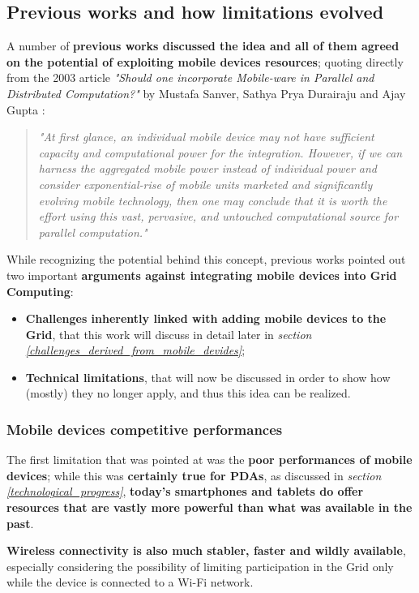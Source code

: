 \subsection{Previous works and how limitations evolved}\label{previous_works_and_limitations}
A number of \textbf{previous works discussed the idea and all of them agreed on the potential of exploiting mobile devices resources}; quoting directly from the 2003 article \textit{"Should one incorporate Mobile-ware in Parallel and Distributed Computation?"} by Mustafa Sanver, Sathya Prya Durairaju and Ajay Gupta \cite{should_one_incorporate_mobile_ware}:
\begin{quotation}
    \textit{"At first glance, an individual mobile device may not have sufficient capacity and computational power for the integration. However, if we can harness the aggregated mobile power instead of individual power and consider exponential-rise of mobile units marketed and significantly evolving mobile technology, then one may conclude that it is worth the effort using this vast, pervasive, and untouched computational source for parallel computation."}
\end{quotation}

While recognizing the potential behind this concept, previous works pointed out two important \textbf{arguments against integrating mobile devices into Grid Computing}:
\begin{itemize}
    \item \textbf{Challenges inherently linked with adding mobile devices to the Grid}, that this work will discuss in detail later in \textit{section \ref{challenges_derived_from_mobile_devides}};
    \item \textbf{Technical limitations}, that will now be discussed in order to show how (mostly) they no longer apply, and thus this idea can be realized.
\end{itemize}

\subsubsection{Mobile devices competitive performances}
The first limitation that was pointed at was the \textbf{poor performances of mobile devices}; while this was \textbf{certainly true for PDAs}, as discussed in \textit{section \ref{technological_progress}}, \textbf{today's smartphones and tablets do offer resources that are vastly more powerful than what was available in the past}.

\textbf{Wireless connectivity is also much stabler, faster and wildly available}, especially considering the possibility of limiting participation in the Grid only while the device is connected to a Wi-Fi network.

